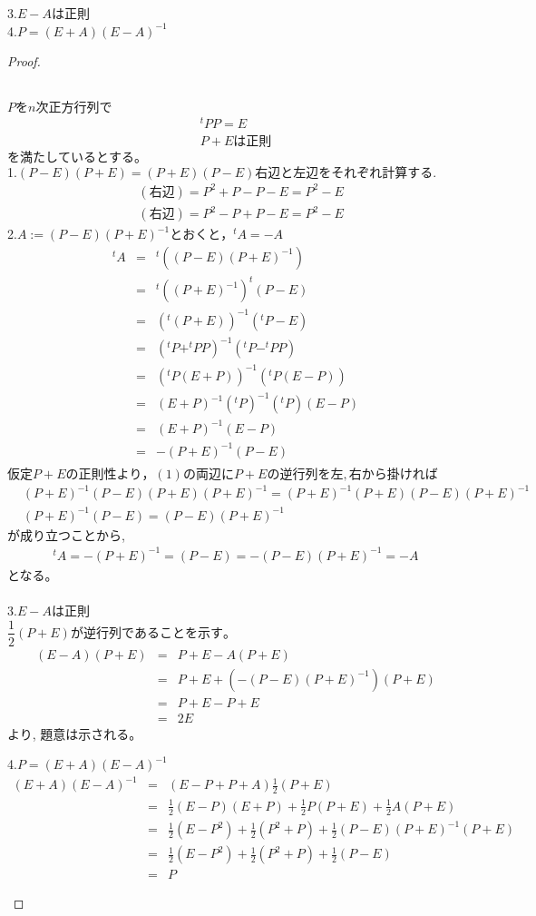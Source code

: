 \documentclass[dvipdfmx,uplatex,11pt]{jsarticle}
\begin{document}
3.$E−Aは正則$\\
4.$P=(E + A)(E − A)^{−1}$
\begin{proof}
\begin{leftbar}
~\\
$Pをn次正方行列で$
\begin{eqnarray*}
^t PP=E\\
P+Eは正則
\end{eqnarray*}
$を満たしているとする。$\\
1.$(P − E)(P + E) = (P + E)(P − E)右辺と左辺をそれぞれ計算する.$
\begin{eqnarray*}
& (右辺) = P^2+P−P−E=P^2−E\\
& (右辺) = P^2−P+P−E=P^2−E
\end{eqnarray*}
2.$A := (P − E)(P + E)^{−1}とおくと，^tA=−A$
\begin{eqnarray*}
^tA&=&^t((P−E)(P+E)^{−1})\\
&=&^t((P+E)^{-1})^t(P−E)\\
&=&(^t(P+E))^{-1}(^tP−E)\\
&=&(^tP+^tPP)^{-1}(^tP−^tPP)\\
&=&(^tP(E + P))^{-1}(^tP(E − P))\\
&=&(E + P)^{−1}(^tP)^{−1}(^tP)(E − P)\\
&=&(E + P)^{−1}(E − P)\\
&=&−(P + E)^{−1}(P − E)\\
\end{eqnarray*}
$仮定P+Eの正則性より，(1)の両辺にP+Eの逆行列を左, 右から掛ければ$
\begin{eqnarray*}
& (P + E)^{-1}(P − E)(P + E)(P + E)^{−1}=(P + E)^{−1}(P + E)(P − E)(P + E)^{−1}\\
& (P + E)^{−1}(P − E)=(P − E)(P + E)^{−1}
\end{eqnarray*}
が成り立つことから,
\begin{eqnarray*}
^tA = −(P + E)^{−1}=(P − E) = −(P − E)(P + E)^{−1}= −A
\end{eqnarray*}
となる。\\
\\
3.$E − A は正則$\\
$\dfrac{1}{2}(P + E) が逆行列であることを示す。$
\begin{eqnarray*}
(E−A)(P+E)&=&P+E−A(P+E)\\
&=&P+E+(−(P − E)(P + E)^{−1})(P + E)\\
&=&P+E−P+E \\
&=&2E
\end{eqnarray*}
より, 題意は示される。
\end{leftbar}
%
%
%
\newpage
%
%
%
\begin{leftbar}
4.$P= (E + A)(E − A)^{−1}$
\begin{eqnarray*}
(E + A)(E − A)^{−1}&=&(E − P + P + A)\frac{1}{2}(P + E)\\
&=&\frac{1}{2}(E − P)(E + P)+\frac{1}{2}P(P + E)+\frac{1}{2}A(P + E)\\
&=&\frac{1}{2}(E − P^2) +\frac{1}{2}(P^2+P)+\frac{1}{2}(P − E)(P + E)^{−1}(P + E)\\
&=&\frac{1}{2}(E − P^2)+\frac{1}{2}(P^2+P)+\frac{1}{2}(P − E)\\
&=&P
\end{eqnarray*}
\end{leftbar}
\end{proof}
\end{document}
